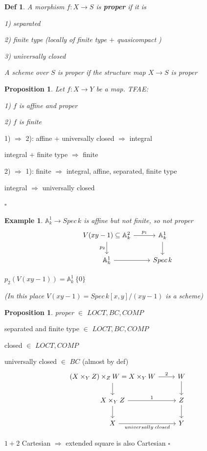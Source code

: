 \documentclass{article}
\newtheorem{definition}[theorem]{Def}
\newtheorem{example}[theorem]{Example}
\newtheorem{proposition}[theorem]{Proposition}
\newenvironment{Proof}{{\noindent \indent \it Proof:\quad}}{\hfill $\square$\par}
\begin{document}
\begin{definition}
    A morphism $f : X \to S$ is \textbf{proper} if it is
    
    1) separated 
    
    2) finite type (locally of finite type $+$ quasicompact ) 
    
    3) universally closed
    
    A scheme over $S$ is proper if the structure map $X \to S$ is proper
\end{definition}

\begin{proposition}
    Let $f:X\to Y$ be a map. TFAE:

    1) $f$ is affine and proper

    2) $f$ is finite
\end{proposition}
\begin{Proof}
    1) $\Rightarrow$ 2): affine $+$ universally closed $\Rightarrow$ integral

    integral $+$ finite type $\Rightarrow$ finite

    2) $\Rightarrow$ 1): finite $\Rightarrow$ integral, affine, separated, finite type

    integral $\Rightarrow$ universally closed
    
\end{Proof}

\begin{example}
    $\mathbb A_k^1\to Spec\,k$ is affine but not finite, so not proper
\[\begin{tikzcd}
	{V(xy-1)\subseteq\mathbb A_k^2} & {\mathbb A_k^1} \\
	{\mathbb A_k^1} & {Spec\,k}
	\arrow["{p_2}"', from=1-1, to=2-1]
	\arrow[from=1-2, to=2-2]
	\arrow[from=2-1, to=2-2]
	\arrow["{p_1}", from=1-1, to=1-2]
\end{tikzcd}\]

$p_2(V(xy-1))=\mathbb A_k^1\ \{0\}$

(In this place $V(xy-1)=Spec\,k[x,y]/(xy-1)$ is a scheme)
\end{example}

\begin{proposition}
    proper $\in$ $LOCT,BC,COMP$
\end{proposition}
\begin{Proof}
    separated and finite type $\in$ $LOCT,BC,COMP$

    closed $\in$ $LOCT,COMP$

    universally closed $\in$ $BC$ (almost by def)
\[\begin{tikzcd}
	{(X\times_Y Z)\times_Z W=X\times_Y W} & W \\
	{X\times_Y Z} & Z \\
	X & Y
	\arrow["2", from=1-1, to=1-2]
	\arrow[from=1-1, to=2-1]
	\arrow[from=2-1, to=3-1]
	\arrow["{universally\; closed}"', from=3-1, to=3-2]
	\arrow[from=1-2, to=2-2]
	\arrow[from=2-2, to=3-2]
	\arrow["1", from=2-1, to=2-2]
\end{tikzcd}\]

$1+2$ Cartesian $\Rightarrow$ extended square is also Cartesian
\end{Proof}
\end{document}

